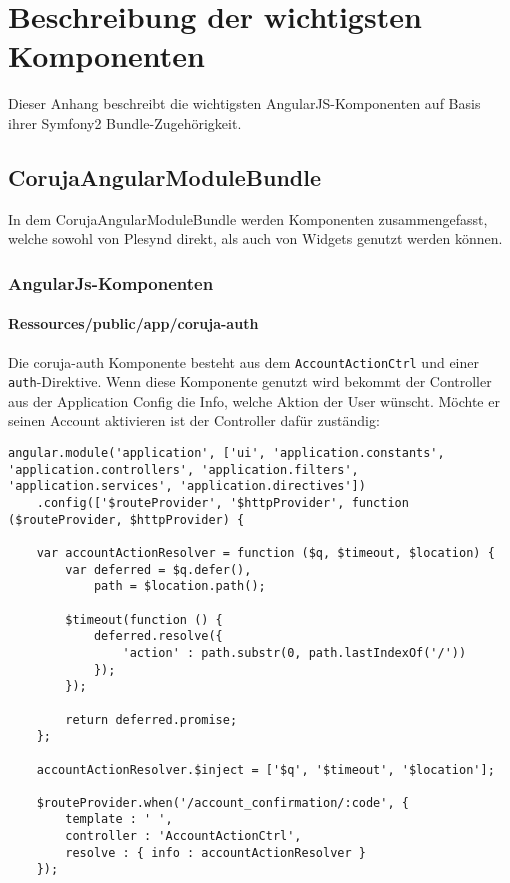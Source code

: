 \chapter{Beschreibung der wichtigsten Komponenten}
\label{AppendixB}

Dieser Anhang beschreibt die wichtigsten AngularJS-Komponenten auf Basis ihrer Symfony2 Bundle-Zugehörigkeit.
\section{CorujaAngularModuleBundle}
In dem CorujaAngularModuleBundle werden Komponenten zusammengefasst, welche sowohl von Plesynd direkt, als auch von Widgets genutzt werden können. 

\subsection{AngularJs-Komponenten}

\subsubsection*{Ressources/public/app/coruja-auth}\label{section:coruja_auth}
Die coruja-auth Komponente besteht aus dem \texttt{AccountActionCtrl} und einer \texttt{auth}-Direktive. Wenn diese Komponente genutzt wird bekommt der Controller aus der Application Config die Info, welche Aktion der User wünscht. Möchte er seinen Account aktivieren ist der Controller dafür zuständig:
\begin{lstlisting}[caption=Hauptapplikation reagiert auf Account Confirmation Route]
 angular.module('application', ['ui', 'application.constants', 'application.controllers', 'application.filters', 'application.services', 'application.directives'])
    .config(['$routeProvider', '$httpProvider', function ($routeProvider, $httpProvider) {

    var accountActionResolver = function ($q, $timeout, $location) {
        var deferred = $q.defer(),
            path = $location.path();

        $timeout(function () {
            deferred.resolve({
                'action' : path.substr(0, path.lastIndexOf('/'))
            });
        });

        return deferred.promise;
    };

    accountActionResolver.$inject = ['$q', '$timeout', '$location'];

    $routeProvider.when('/account_confirmation/:code', {
        template : ' ',
        controller : 'AccountActionCtrl',
        resolve : { info : accountActionResolver }
    });

\end{lstlisting}

